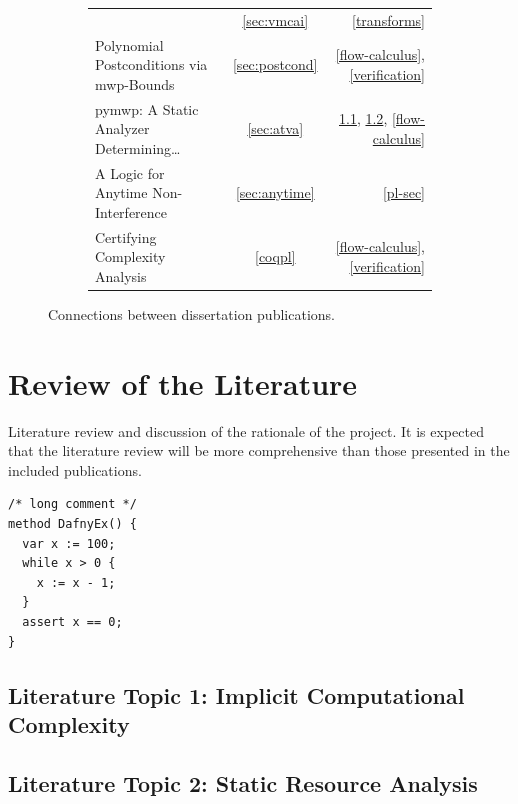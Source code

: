 \begin{figure}[p]
\begin{subfigure}{\textwidth}
\begin{tabularx}{\textwidth}{Xcr}
      & \autoref{sec:vmcai}
      & \ref{transforms} \\
      {Polynomial Postconditions via mwp-Bounds}
      & \ref{sec:postcond}
      & \ref{flow-calculus}, \ref{verification} \\
      {pymwp: A Static Analyzer Determining\ldots}
      & \ref{sec:atva}
      & \ref{icc}, \ref{static-analysis}, \ref{flow-calculus} \\
      {A Logic for Anytime Non-Interference}
      & \ref{sec:anytime}
      & \ref{pl-sec} \\
      {Certifying Complexity Analysis}
      & \ref{coqpl}
      & \ref{flow-calculus}, \ref{verification} \\
      \bottomrule
    \end{tabularx}
  \end{subfigure}
  \caption[Connected papers]{Connections between dissertation publications.}
  \label{fig:conn_papers}
\end{figure}

%
%

\clearpage\section{Review of the Literature}\label{sec:pre}

Literature review and discussion of the rationale of the project.
It is expected that the literature review will be more comprehensive than
those presented in the included publications.

\begin{lstlisting}[style=Dafny,caption={a code block test}]
/* long comment */
method DafnyEx() {
  var x := 100;
  while x > 0 {
    x := x - 1;
  }
  assert x == 0;
}
\end{lstlisting}


\subsection{Literature Topic 1: Implicit Computational Complexity}\label{icc}
\subsection{Literature Topic 2: Static Resource Analysis}\label{static-analysis}
